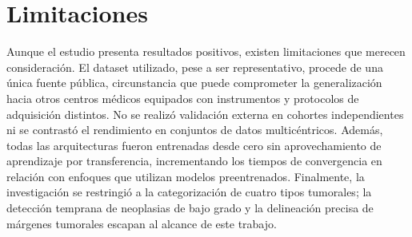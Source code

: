 \section{Limitaciones}
\label{sec:limitations}

Aunque el estudio presenta resultados positivos, existen limitaciones que merecen consideración. El dataset utilizado, pese a ser representativo, procede de una única fuente pública, circunstancia que puede comprometer la generalización hacia otros centros médicos equipados con instrumentos y protocolos de adquisición distintos. No se realizó validación externa en cohortes independientes ni se contrastó el rendimiento en conjuntos de datos multicéntricos. Además, todas las arquitecturas fueron entrenadas desde cero sin aprovechamiento de aprendizaje por transferencia, incrementando los tiempos de convergencia en relación con enfoques que utilizan modelos preentrenados. Finalmente, la investigación se restringió a la categorización de cuatro tipos tumorales; la detección temprana de neoplasias de bajo grado y la delineación precisa de márgenes tumorales escapan al alcance de este trabajo.
